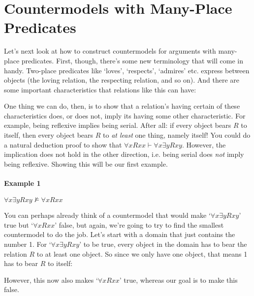 \section{Countermodels with Many-Place Predicates}

Let's next look at how to construct countermodels for arguments with many-place predicates.  First, though, there's some new terminology that will come in handy.  Two-place predicates like `loves', `respects', `admires' etc. express  between objects (the loving relation, the respecting relation, and so on).  And there are some important characteristics that relations like this can have:

One thing we can do, then, is to show that a relation's having certain of these characteristics does, or does not, imply its having some other characteristic.  For example, being reflexive implies being serial. After all: if every object bears $R$ to itself, then every object bears $R$ to \emph{at least} one thing, namely itself!  You could do a natural deduction proof to show that $\forall x Rxx \vdash \forall x \exists y Rxy$.  However, the implication does not hold in the other direction, i.e. being serial does \emph{not} imply being reflexive.  Showing this will be our first example.

\paragraph{Example 1} $\forall x \exists y Rxy \nvDash \forall xRxx$

You can perhaps already think of a countermodel that would make `$\forall x \exists y Rxy$' true but `$ \forall xRxx$' false, but again, we're going to try to find the smallest countermodel to do the job.  Let's start with a domain that just contains the number 1.  For `$\forall x \exists y Rxy$' to be true, every object in the domain has to bear the relation $R$ to at least one object.  So since we only have one object, that means 1 has to bear $R$ to itself:
\begin{center}
\end{center}
However, this now also makes `$\forall xRxx$' true, whereas our goal is to make this false.

